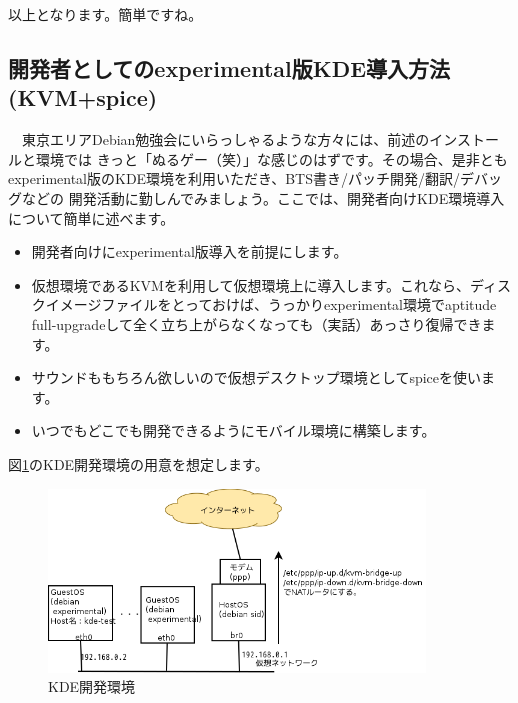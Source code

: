 \documentclass[mingoth,a4paper]{jsarticle}
\begin{document}
以上となります。簡単ですね。

\subsection{\label{sec:exp-kde}開発者としてのexperimental版KDE導入方法(KVM+spice)}

　東京エリアDebian勉強会にいらっしゃるような方々には、前述のインストールと環境では
きっと「ぬるゲー（笑）」な感じのはずです。その場合、是非とも
experimental版のKDE環境を利用いただき、BTS書き/パッチ開発/翻訳/デバッグなどの
開発活動に勤しんでみましょう。ここでは、開発者向けKDE環境導入について簡単に述べます。

\begin{itemize}
\item 開発者向けにexperimental版導入を前提にします。
\item 仮想環境であるKVMを利用して仮想環境上に導入します。これなら、ディスクイメージファイルをとっておけば、うっかりexperimental環境でaptitude full-upgradeして全く立ち上がらなくなっても（実話）あっさり復帰できます。
\item サウンドももちろん欲しいので仮想デスクトップ環境としてspiceを使います。
\item いつでもどこでも開発できるようにモバイル環境に構築します。
\end{itemize}
図\ref{fig:kde-env}のKDE開発環境の用意を想定します。

\begin{figure}[ht]
\begin{center}
\includegraphics[width=10cm]{image201202/kdedesk/kde-dev-env.png}
\caption{\label{fig:kde-env}KDE開発環境}
\end{center}
\end{figure}
\end{document}
